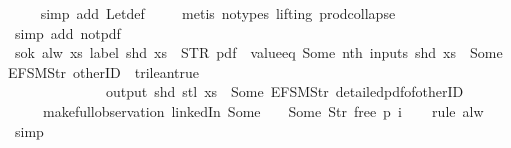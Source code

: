 \begin{isabellebody}
\ \ \ \isamarkupfalse%
\ {\isacharparenleft}simp\ add{\isacharcolon}\ Let{\isacharunderscore}def{\isacharparenright}\isanewline
\ \ \ \isamarkupfalse%
\ {\isacharparenleft}metis\ {\isacharparenleft}no{\isacharunderscore}types{\isacharcomma}\ lifting{\isacharparenright}\ prod{\isachardot}collapse{\isacharparenright}\isanewline
\ \ \isamarkupfalse%
\ {\isacharparenleft}simp\ add{\isacharcolon}\ not{\isacharunderscore}pdf{\isacharunderscore}{}{\isacharparenright}%
\endisatagproof
{\isafoldproof}%
%
\isadelimproof
\isanewline
%
\endisadelimproof
\isanewline
{}\isamarkupfalse%
\ s{}{\isacharunderscore}ok{\isacharcolon}\ {\isachardoublequoteopen}alw\ {\isacharparenleft}{\isasymlambda}xs{\isachardot}\ label\ {\isacharparenleft}shd\ xs{\isacharparenright}\ {\isacharequal}\ STR\ {\isacharprime}{\isacharprime}pdf{\isacharprime}{\isacharprime}\ {\isasymand}\ value{\isacharunderscore}eq\ {\isacharparenleft}Some\ {\isacharparenleft}nth\ {\isacharparenleft}inputs\ {\isacharparenleft}shd\ xs{\isacharparenright}{\isacharparenright}\ {}{\isacharparenright}{\isacharparenright}\ {\isacharparenleft}Some\ {\isacharparenleft}EFSM{\isachardot}Str\ {\isacharprime}{\isacharprime}otherID{\isacharprime}{\isacharprime}{\isacharparenright}{\isacharparenright}\ {\isacharequal}\ trilean{\isachardot}true\ {\isasymlongrightarrow}\isanewline
\ \ \ \ \ \ \ \ \ \ \ \ \ \ output\ {\isacharparenleft}shd\ {\isacharparenleft}stl\ xs{\isacharparenright}{\isacharparenright}\ {\isasymnoteq}\ {\isacharbrackleft}Some\ {\isacharparenleft}EFSM{\isachardot}Str\ {\isacharprime}{\isacharprime}detailed{\isacharunderscore}pdf{\isacharunderscore}of{\isacharunderscore}otherID{\isacharprime}{\isacharprime}{\isacharparenright}{\isacharbrackright}{\isacharparenright}\isanewline
\ \ \ \ \ {\isacharparenleft}make{\isacharunderscore}full{\isacharunderscore}observation\ linkedIn\ {\isacharparenleft}Some\ {}{\isacharparenright}\ {\isacharparenleft}{\isacharless}{\isachargreater}{\isacharparenleft}{}\ {\isachardollar}{\isacharcolon}{\isacharequal}\ Some\ {\isacharparenleft}Str\ {\isacharprime}{\isacharprime}free{\isacharprime}{\isacharprime}{\isacharparenright}{\isacharparenright}{\isacharparenright}\ p\ i{\isacharparenright}{\isachardoublequoteclose}\isanewline
%
\isadelimproof
\ \ %
\endisadelimproof
%
\isatagproof
{}\isamarkupfalse%
\ {\isacharparenleft}rule\ alw{\isacharparenright}\isanewline
\ \ \ \isamarkupfalse%
\ simp\isanewline
\ \ \isamarkupfalse%

\end{isabellebody}

